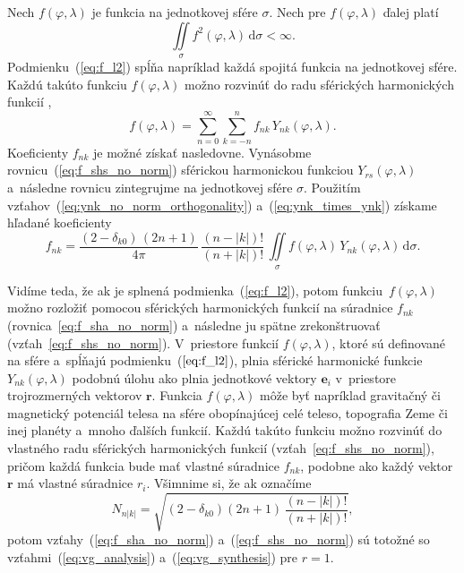 \documentclass[a4paper, 12pt]{book}
\newcommand{\diff}{\mathrm d}
\let\vec\mathbf
\begin{document}
Nech $f(\varphi, \lambda)$ je funkcia na jednotkovej sfére $\sigma$.  Nech pre
$f(\varphi, \lambda)$ ďalej platí
%
\begin{equation}
\label{eq:f_l2}
\iint\limits_\sigma f^2(\varphi, \lambda) \, \diff \sigma < \infty{.}
\end{equation}
%
Podmienku~(\ref{eq:f_l2}) spĺňa napríklad každá spojitá funkcia na jednotkovej
sfére.  Každú takúto funkciu $f(\varphi, \lambda)$ možno rozvinúť do radu
sférických harmonických funkcií \parencite[napríklad][]{MoritzPhysicalGeodesy},
%
\begin{equation}
\label{eq:f_shs_no_norm}
f(\varphi, \lambda) = \sum_{n = 0}^\infty \sum_{k = -n}^n f_{nk} \,
Y_{nk}(\varphi, \lambda){.}
\end{equation}
%
Koeficienty $f_{nk}$ je možné získať nasledovne.  Vynásobme 
rovnicu~(\ref{eq:f_shs_no_norm}) sférickou harmonickou funkciou 
$Y_{rs}(\varphi, \lambda)$ a~následne rovnicu zintegrujme na jednotkovej sfére 
$\sigma$.  Použitím vzťahov~(\ref{eq:ynk_no_norm_orthogonality}) 
a~(\ref{eq:ynk_times_ynk}) získame hľadané koeficienty
%
\begin{equation}
\label{eq:f_sha_no_norm}
f_{nk} = \frac{(2 - \delta_{k0}) \, (2n + 1)}{4\pi} \, \frac{(n - |k|)!}{(n 
+ |k|)!} \, \iint\limits_{\sigma} f(\varphi, \lambda) \, Y_{nk}(\varphi, 
\lambda) \, \diff \sigma{.}
\end{equation}

Vidíme teda, že ak je splnená podmienka~(\ref{eq:f_l2}), potom 
funkciu~$f(\varphi, \lambda)$ možno rozložiť pomocou sférických harmonických 
funkcií na súradnice $f_{nk}$ (rovnica~\ref{eq:f_sha_no_norm}) a~následne ju 
spätne zrekonštruovať (vzťah~\ref{eq:f_shs_no_norm}).  V~priestore funkcií 
$f(\varphi, \lambda)$, ktoré sú definované na sfére a~spĺňajú 
podmienku~($\ref{eq:f_l2}$), plnia sférické harmonické funkcie $Y_{nk}(\varphi, 
\lambda)$ podobnú úlohu ako plnia jednotkové vektory $\vec e_i$ v~priestore 
trojrozmerných vektorov $\vec r$.  Funkcia $f(\varphi,\lambda)$ môže byť 
napríklad gravitačný či magnetický potenciál telesa na sfére obopínajúcej celé 
teleso, topografia Zeme či inej planéty a~mnoho ďalších funkcií.  Každú takúto 
funkciu možno rozvinúť do vlastného radu sférických harmonických funkcií 
(vzťah~\ref{eq:f_shs_no_norm}), pričom každá funkcia bude mať vlastné súradnice 
$f_{nk}$, podobne ako každý vektor $\vec r$ má vlastné súradnice $r_i$.  
Všimnime si, že ak označíme
%
\begin{equation}
\label{eq:sh_norm}
N_{n|k|} = \sqrt{(2 - \delta_{k0}) (2n + 1) \, \frac{(n - |k|)!}{(n
+ |k|)!}}{,}
\end{equation}
%
potom vzťahy~(\ref{eq:f_sha_no_norm}) a~(\ref{eq:f_shs_no_norm}) sú totožné so
vzťahmi~(\ref{eq:vg_analysis}) a~(\ref{eq:vg_synthesis}) pre $r = 1$.
\end{document}
